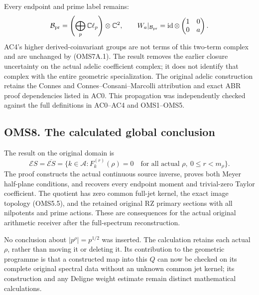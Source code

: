 Every endpoint and prime label remains: \[
\mathcal B_{\rm pr}=\left(\bigoplus_p\mathbb C\ell_p\right)\otimes\mathbb C^2,
\qquad W_a|_{\mathcal B_{\rm pr}}=
\operatorname{id}\otimes\begin{pmatrix}1&0\\0&a\end{pmatrix}.
\] AC4's higher derived-coinvariant groups are not terms of this
two-term complex and are unchanged by (OMS7A.1). The result removes the
earlier closure uncertainty on the actual adelic coefficient complex; it
does not identify that complex with the entire geometric specialization.
The original adelic construction retains the Connes and
Connes--Consani--Marcolli attribution and exact ABR proof dependencies
listed in AC0. This propagation was independently checked against the
full definitions in AC0--AC4 and OMS1--OMS5.

\subsection{OMS8. The calculated global
conclusion}\label{oms8.-the-calculated-global-conclusion}

The result on the original domain is \[
\boxed{\mathcal ES=\overline{\mathcal ES}
=\{k\in\mathcal A:F_k^{(r)}(\rho)=0
\quad\text{for all actual }\rho,\ 0\le r<m_\rho\}.}
\tag{OMS8.1}
\] The proof constructs the actual continuous source inverse, proves
both Meyer half-plane conditions, and recovers every endpoint moment and
trivial-zero Taylor coefficient. The quotient has zero common full-jet
kernel, the exact image topology (OMS5.5), and the retained original RZ
primary sections with all nilpotents and prime actions. These are
consequences for the actual original arithmetic receiver after the
full-spectrum reconstruction.

No conclusion about \(|p^\rho|=p^{1/2}\) was inserted. The calculation
retains each actual \(\rho\), rather than moving it or deleting it. Its
contribution to the geometric programme is that a constructed map into
this \(Q\) can now be checked on its complete original spectral data
without an unknown common jet kernel; its construction and any Deligne
weight estimate remain distinct mathematical calculations.

